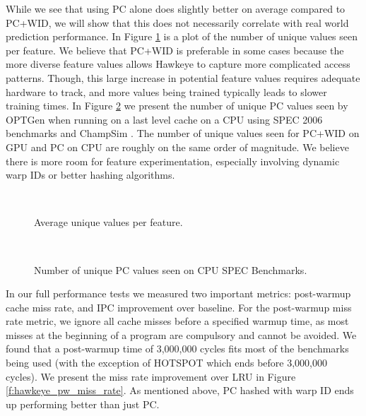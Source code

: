 While we see that using PC alone does slightly better on average compared to PC+WID, we will show that this does not necessarily correlate with real world prediction performance. In Figure \ref{f:opt_uniq_vals} is a plot of the number of unique values seen per feature. We believe that PC+WID is preferable in some cases because the more diverse feature values allows Hawkeye to capture more complicated access patterns. Though, this large increase in potential feature values requires adequate hardware to track, and more values being trained typically leads to slower training times. In Figure \ref{f:cpu_opt_uniq_vals} we present the number of unique PC values seen by OPTGen when running on a last level cache on a CPU using SPEC 2006 \cite{spec} benchmarks and ChampSim \cite{champsim}. The number of unique values seen for PC+WID on GPU and PC on CPU are roughly on the same order of magnitude. We believe there is more room for feature experimentation, especially involving dynamic warp IDs or better hashing algorithms.


\begin{figure}[htb]
\begin{center}
\ 
\caption{Average unique values per feature.}
\label{f:opt_uniq_vals}
\end{center}
\end{figure}

\begin{figure}[htb]
\begin{center}
\ 
\caption{Number of unique PC values seen on CPU SPEC Benchmarks.}
\label{f:cpu_opt_uniq_vals}
\end{center}
\end{figure}

In our full performance tests we measured two important metrics: post-warmup cache miss rate, and IPC improvement over baseline. For the post-warmup miss rate metric, we ignore all cache misses before a specified warmup time, as most misses at the beginning of a program are compulsory and cannot be avoided. We found that a post-warmup time of 3,000,000 cycles fits most of the benchmarks being used (with the exception of HOTSPOT which ends before 3,000,000 cycles). We present the miss rate improvement over LRU in Figure \ref{f:hawkeye_pw_miss_rate}. As mentioned above, PC hashed with warp ID ends up performing better than just PC.


